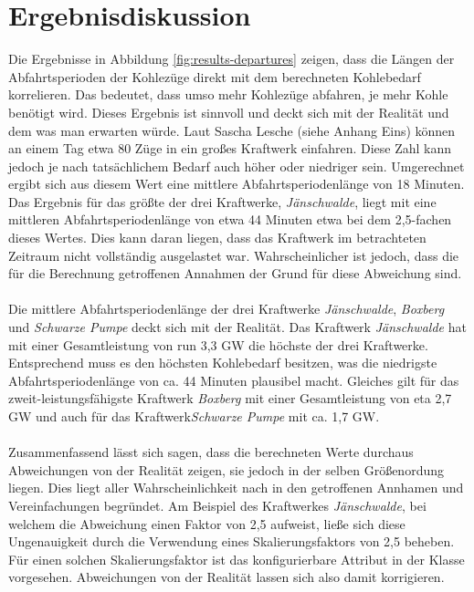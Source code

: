 \section{Ergebnisdiskussion}

Die Ergebnisse in Abbildung \ref{fig:results-departures} zeigen, dass die Längen der Abfahrtsperioden der Kohlezüge direkt mit dem berechneten Kohlebedarf korrelieren. Das bedeutet, dass umso mehr Kohlezüge abfahren, je mehr Kohle benötigt wird. Dieses Ergebnis ist sinnvoll und deckt sich mit der Realität und dem was man erwarten würde. Laut Sascha Lesche (siehe Anhang Eins) können an einem Tag etwa 80 Züge in ein großes Kraftwerk einfahren. Diese Zahl kann jedoch je nach tatsächlichem Bedarf auch höher oder niedriger sein. Umgerechnet ergibt sich aus diesem Wert eine mittlere Abfahrtsperiodenlänge von 18 Minuten. Das Ergebnis für das größte der drei Kraftwerke, \emph{Jänschwalde}, liegt mit eine mittleren Abfahrtsperiodenlänge von etwa 44 Minuten etwa bei dem 2,5-fachen dieses Wertes. Dies kann daran liegen, dass das Kraftwerk im betrachteten Zeitraum nicht vollständig ausgelastet war. Wahrscheinlicher ist jedoch, dass die für die Berechnung getroffenen Annahmen der Grund für diese Abweichung sind.\\
\\
Die mittlere Abfahrtsperiodenlänge der drei Kraftwerke \emph{Jänschwalde}, \emph{Boxberg} und \emph{Schwarze Pumpe} deckt sich mit der Realität. Das Kraftwerk \emph{Jänschwalde} hat mit einer Gesamtleistung von run 3,3 GW die höchste der drei Kraftwerke. Entsprechend muss es den höchsten Kohlebedarf besitzen, was die niedrigste Abfahrtsperiodenlänge von ca. 44 Minuten plausibel macht. Gleiches gilt für das zweit-leistungsfähigste Kraftwerk \emph{Boxberg} mit einer Gesamtleistung von eta 2,7 GW und auch für das Kraftwerk\emph{Schwarze Pumpe} mit ca. 1,7 GW. \cite{noauthor_bundesnetzagentur_nodate}\\
\\
Zusammenfassend lässt sich sagen, dass die berechneten Werte durchaus Abweichungen von der Realität zeigen, sie jedoch in der selben Größenordung liegen. Dies liegt aller Wahrscheinlichkeit nach in den getroffenen Annhamen und Vereinfachungen begründet. Am Beispiel des Kraftwerkes \emph{Jänschwalde}, bei welchem die Abweichung einen Faktor von 2,5 aufweist, ließe sich diese Ungenauigkeit durch die Verwendung eines Skalierungsfaktors von 2,5 beheben. Für einen solchen Skalierungsfaktor ist das konfigurierbare Attribut  in der Klasse  vorgesehen. Abweichungen von der Realität lassen sich also damit korrigieren.